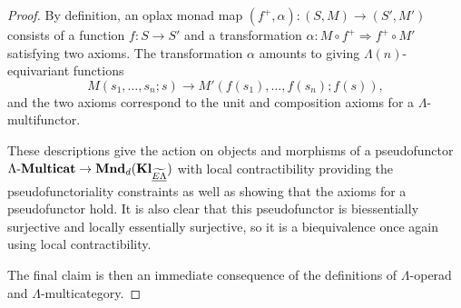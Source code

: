 \begin{proof}
By definition, an oplax monad map $(f^{+}, \alpha) \colon  (S,M) \rightarrow (S', M')$ consists of a function $f \colon S \rightarrow S'$ and a transformation $\alpha \colon M \circ f^{+} \Rightarrow f^{+} \circ M'$ satisfying two axioms. The transformation $\alpha$ amounts to giving $\Lambda(n)$-equivariant functions
  \[
    M(s_1, \ldots, s_n; s) \rightarrow M'\left(f(s_1), \ldots, f(s_n); f(s)\right),
  \]
and the two axioms correspond to the unit and composition axioms for a $\Lambda$-multifunctor.

These descriptions give the action on objects and morphisms of a pseudofunctor $\Lambda\mbox{-}\mathbf{Multicat} \rightarrow \mathbf{Mnd}_{d}(\mathbf{Kl}_{\widetilde{\underline{E\Lambda}}})$ with local contractibility providing the pseudofunctoriality constraints as well as showing that the axioms for a pseudofunctor hold. It is also clear that this pseudofunctor is biessentially surjective and locally essentially surjective, so it is a biequivalence once again using local contractibility.

The final claim is then an immediate consequence of the definitions of $\Lambda$-operad and $\Lambda$-multicategory.
\end{proof}
